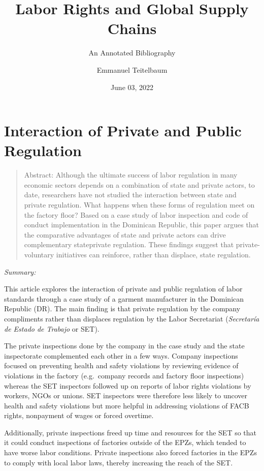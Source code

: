 \documentclass[
  12pt,
]{article}
\title{Labor Rights and Global Supply Chains}
\subtitle{An Annotated Bibliography}
\author{Emmanuel Teitelbaum}
\date{June 03, 2022}
\begin{document}
\maketitle

\hypertarget{interaction-of-private-and-public-regulation}{%
\section{Interaction of Private and Public
Regulation}\label{interaction-of-private-and-public-regulation}}

\begin{quote}
Abstract: 
Although the ultimate success of labor regulation in many economic sectors depends on a combination of state and private actors, to date, researchers have not studied the interaction between state and private regulation. What happens when these forms of regulation meet on the factory floor? Based on a case study of labor inspection and code of conduct implementation in the Dominican Republic, this paper argues that the comparative advantages of state and private actors can drive complementary state\textendash private regulation. These findings suggest that private-voluntary initiatives can reinforce, rather than displace, state regulation.
\end{quote}

\emph{Summary:}

This article explores the interaction of private and public regulation
of labor standards through a case study of a garment manufacturer in the
Dominican Republic (DR). The main finding is that private regulation by
the company compliments rather than displaces regulation by the Labor
Secretariat (\emph{Secretaría de Estado de Trabajo} or SET).

The private inspections done by the company in the case study and the
state inspectorate complemented each other in a few ways. Company
inspections focused on preventing health and safety violations by
reviewing evidence of violations in the factory (e.g.~company records
and factory floor inspections) whereas the SET inspectors followed up on
reports of labor rights violations by workers, NGOs or unions. SET
inspectors were therefore less likely to uncover health and safety
violations but more helpful in addressing violations of FACB rights,
nonpayment of wages or forced overtime.

Additionally, private inspections freed up time and resources for the
SET so that it could conduct inspections of factories outside of the
EPZs, which tended to have worse labor conditions. Private inspections
also forced factories in the EPZs to comply with local labor laws,
thereby increasing the reach of the SET.
\end{document}

